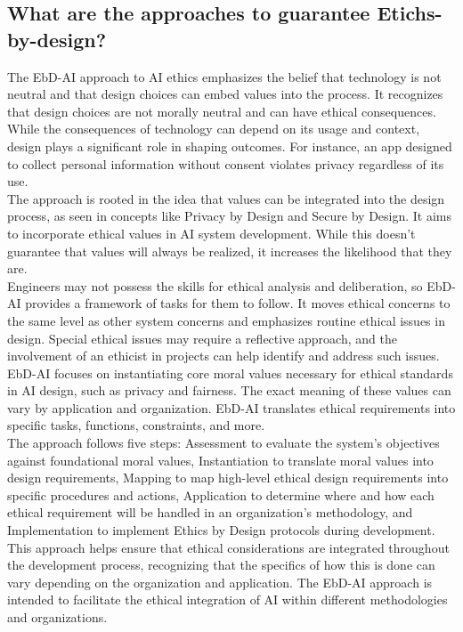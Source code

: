 \documentclass{article}
\begin{document}
\newpage
\subsection{What are the approaches to guarantee Etichs-by-design?}
The EbD-AI approach to AI ethics emphasizes the belief that technology is not neutral and that design choices can embed values into the process. It recognizes that design choices are not morally neutral and can have ethical consequences. While the consequences of technology can depend on its usage and context, design plays a significant role in shaping outcomes. For instance, an app designed to collect personal information without consent violates privacy regardless of its use. \\
The approach is rooted in the idea that values can be integrated into the design process, as seen in concepts like Privacy by Design and Secure by Design. It aims to incorporate ethical values in AI system development. While this doesn't guarantee that values will always be realized, it increases the likelihood that they are. \\
Engineers may not possess the skills for ethical analysis and deliberation, so EbD-AI provides a framework of tasks for them to follow. It moves ethical concerns to the same level as other system concerns and emphasizes routine ethical issues in design. Special ethical issues may require a reflective approach, and the involvement of an ethicist in projects can help identify and address such issues. \\
EbD-AI focuses on instantiating core moral values necessary for ethical standards in AI design, such as privacy and fairness. The exact meaning of these values can vary by application and organization. EbD-AI translates ethical requirements into specific tasks, functions, constraints, and more. \\
The approach follows five steps: Assessment to evaluate the system's objectives against foundational moral values, Instantiation to translate moral values into design requirements, Mapping to map high-level ethical design requirements into specific procedures and actions, Application to determine where and how each ethical requirement will be handled in an organization's methodology, and Implementation to implement Ethics by Design protocols during development. \\
This approach helps ensure that ethical considerations are integrated throughout the development process, recognizing that the specifics of how this is done can vary depending on the organization and application. The EbD-AI approach is intended to facilitate the ethical integration of AI within different methodologies and organizations. \\
\end{document}
